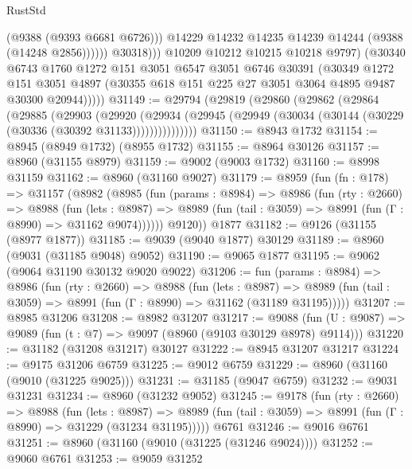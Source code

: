 \begin{lexlean}{RustStd}
\begin{coremodule}
                          (@9388 (@9393 @6681 @6726)))
                        @14229
                        @14232
                        @14235
                        @14239
                        @14244
                        (@9388 (@14248 @2856))))))
                @30318)))
          @10209
          @10212
          @10215
          @10218
          @9797)
        (@30340
          @6743
          @1760
          @1272
          @151
          @3051
          @6547
          @3051
          @6746
          @30391
          (@30349
            @1272
            @151
            @3051
            @4897
            (@30355 @618 @151 @225 @27 @3051 @3064 @4895 @9487 @30300 @20944)))))
@31149 := @29794
    (@29819
      (@29860
        (@29862
          (@29864
            (@29885
              (@29903
                (@29920
                  (@29934
                    (@29945 (@29949 (@30034 (@30144 (@30229 (@30336 (@30392 @31133)))))))))))))))
@31150 := @8943 @1732
@31154 := @8945 (@8949 @1732) (@8955 @1732)
@31155 := @8964 @30126
@31157 := @8960 (@31155 @8979)
@31159 := @9002 (@9003 @1732)
@31160 := @8998 @31159
@31162 := @8960 (@31160 @9027)
@31179 := @8959
    (fun (fn : @178) =>
    @31157
      (@8982
        (@8985
          (fun (params : @8984) =>
          @8986
            (fun (rty : @2660) =>
            @8988
              (fun (lets : @8987) =>
              @8989 (fun (tail : @3059) => @8991 (fun (Γ : @8990) => @31162 @9074))))))
        @9120))
    @1877
@31182 := @9126 (@31155 (@8977 @1877))
@31185 := @9039 (@9040 @1877) @30129
@31189 := @8960 (@9031 (@31185 @9048) @9052)
@31190 := @9065 @1877
@31195 := @9062 (@9064 @31190 @30132 @9020 @9022)
@31206 := fun (params : @8984) =>
  @8986
    (fun (rty : @2660) =>
    @8988
      (fun (lets : @8987) =>
      @8989 (fun (tail : @3059) => @8991 (fun (Γ : @8990) => @31162 (@31189 @31195)))))
@31207 := @8985 @31206
@31208 := @8982 @31207
@31217 := @9088
    (fun (U : @9087) => @9089 (fun (t : @7) => @9097 (@8960 (@9103 @30129 @8978) @9114)))
@31220 := @31182 (@31208 @31217) @30127
@31222 := @8945 @31207 @31217
@31224 := @9175 @31206 @6759
@31225 := @9012 @6759
@31229 := @8960 (@31160 (@9010 (@31225 @9025)))
@31231 := @31185 (@9047 @6759)
@31232 := @9031 @31231
@31234 := @8960 (@31232 @9052)
@31245 := @9178
    (fun (rty : @2660) =>
    @8988
      (fun (lets : @8987) =>
      @8989 (fun (tail : @3059) => @8991 (fun (Γ : @8990) => @31229 (@31234 @31195)))))
    @6761
@31246 := @9016 @6761
@31251 := @8960 (@31160 (@9010 (@31225 (@31246 @9024))))
@31252 := @9060 @6761
@31253 := @9059 @31252

\end{coremodule}
\end{lexlean}
